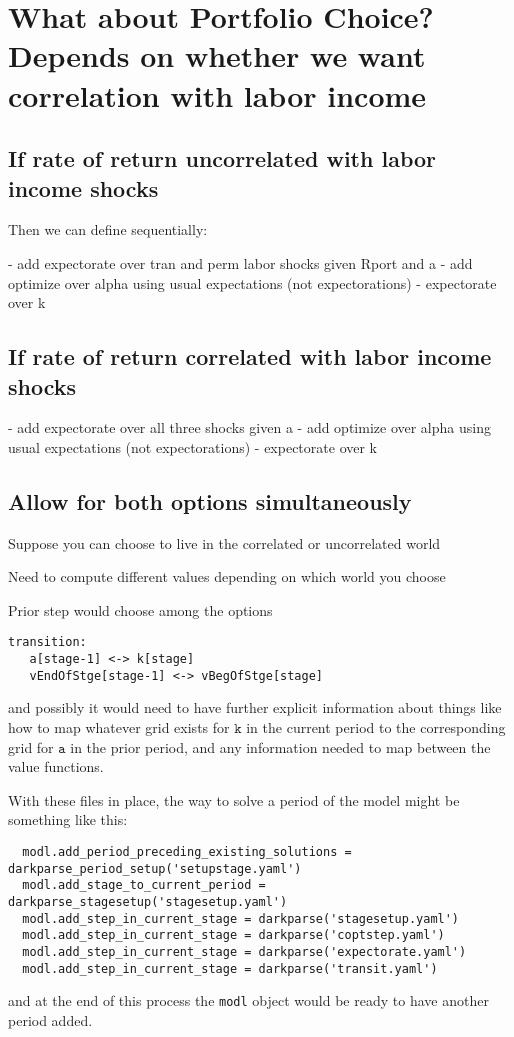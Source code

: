 \documentclass[SolvingMicroDSOPs]{subfiles}
\begin{document}
\section{What about Portfolio Choice?  Depends on whether we want correlation with labor income}

\subsection{If rate of return uncorrelated with labor income shocks}

Then we can define sequentially:

- add expectorate over tran and perm labor shocks given Rport and a
- add optimize over alpha using usual expectations (not expectorations)
- expectorate over k

\subsection{If rate of return correlated with labor income shocks}
- add expectorate over all three shocks given a
- add optimize over alpha using usual expectations (not expectorations)
- expectorate over k

\subsection{Allow for both options simultaneously}

Suppose you can choose to live in the correlated or uncorrelated world

Need to compute different values depending on which world you choose

Prior step would choose among the options

\begin{verbatim}
transition:
   a[stage-1] <-> k[stage]
   vEndOfStge[stage-1] <-> vBegOfStge[stage]
\end{verbatim}
and possibly it would need to have further explicit information about things like how to map whatever grid exists for $\texttt{k}$ in the current period to the corresponding grid for $\texttt{a}$ in the prior period, and any information needed to map between the value functions.

With these files in place, the way to solve a period of the model might be something like this:
\begin{verbatim}
  modl.add_period_preceding_existing_solutions = darkparse_period_setup('setupstage.yaml')
  modl.add_stage_to_current_period = darkparse_stagesetup('stagesetup.yaml')
  modl.add_step_in_current_stage = darkparse('stagesetup.yaml')
  modl.add_step_in_current_stage = darkparse('coptstep.yaml')
  modl.add_step_in_current_stage = darkparse('expectorate.yaml')
  modl.add_step_in_current_stage = darkparse('transit.yaml')
\end{verbatim}
and at the end of this process the \texttt{modl} object would be ready to have another period added.
\end{document}
